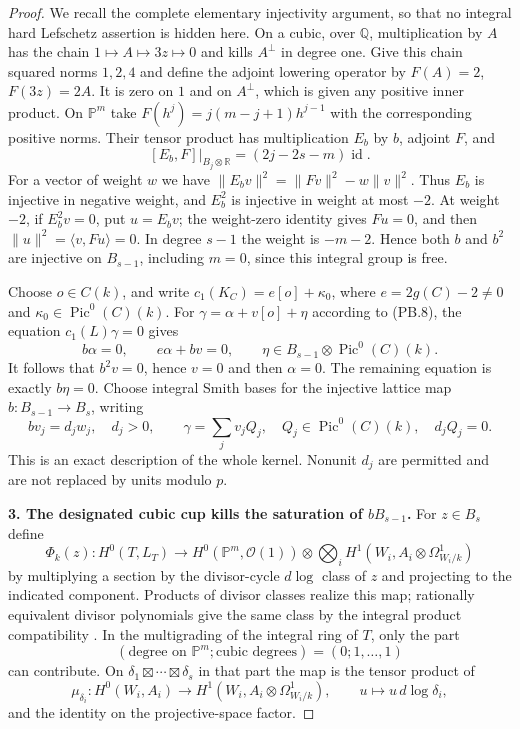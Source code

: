 \begin{proof}
We recall the complete elementary injectivity argument, so that no
integral hard Lefschetz assertion is hidden here. On a cubic, over
$\mathbb Q$, multiplication by $A$ has the chain
$1\mapsto A\mapsto3z\mapsto0$ and kills $A^\perp$ in degree one.
Give this chain squared norms $1,2,4$ and define the adjoint lowering
operator by $F(A)=2$, $F(3z)=2A$. It is zero on $1$ and on $A^\perp$,
which is given any positive inner product. On $\mathbb P^m$ take
$F(h^j)=j(m-j+1)h^{j-1}$ with the corresponding positive norms.
Their tensor product has multiplication $E_b$ by $b$, adjoint $F$,
and
\[
 [E_b,F]|_{B_j\otimes\mathbb R}
       =(2j-2s-m)\operatorname{id}.
\]
For a vector of weight $w$ we have
$\|E_bv\|^2=\|Fv\|^2-w\|v\|^2$.
Thus $E_b$ is injective in negative weight, and $E_b^2$ is injective
in weight at most $-2$. At weight $-2$, if $E_b^2v=0$, put
$u=E_bv$; the weight-zero identity gives $Fu=0$, and then
$\|u\|^2=\langle v,Fu\rangle=0$. In degree $s-1$ the weight is
$-m-2$. Hence both $b$ and $b^2$ are injective on $B_{s-1}$,
including $m=0$, since this integral group is free.

Choose $o\in C(k)$, and write $c_1(K_C)=e[o]+\kappa_0$, where
$e=2g(C)-2\ne0$ and $\kappa_0\in\operatorname{Pic}^0(C)(k)$.
For $\gamma=\alpha+v[o]+\eta$ according to (PB.8), the equation
$c_1(L)\gamma=0$ gives
\[
 b\alpha=0,\qquad e\alpha+bv=0,
 \qquad
 \eta\in B_{s-1}\otimes\operatorname{Pic}^0(C)(k).
\]
It follows that $b^2v=0$, hence $v=0$ and then $\alpha=0$.
The remaining equation is exactly $b\eta=0$.
Choose integral Smith bases for the injective lattice map
$b:B_{s-1}\to B_s$, writing
\[
 bv_j=d_jw_j,\quad d_j>0,
 \qquad
 \gamma=\sum_jv_jQ_j,\quad
 Q_j\in\operatorname{Pic}^0(C)(k),\quad d_jQ_j=0.
 \tag{PB.9}
\]
This is an exact description of the whole kernel. Nonunit $d_j$
are permitted and are not replaced by units modulo $p$.

\textbf{3. The designated cubic cup kills the saturation of $bB_{s-1}$.}
For $z\in B_s$ define
\[
 \Phi_k(z):H^0(T,L_T)\longrightarrow
 H^0(\mathbb P^m,\mathcal O(1))\otimes
            \bigotimes_i H^1(W_i,A_i\otimes\Omega^1_{W_i/k})
 \tag{PB.10}
\]
by multiplying a section by the divisor-cycle $d\log$ class of $z$
and projecting to the indicated component. Products of divisor
classes realize this map; rationally equivalent divisor polynomials
give the same class by the integral product compatibility
\citep[Section 3, diagram (22), pp.~557--558]{cyBraunling2013}.
In the multigrading of the integral ring of $T$, only the part
\[
       (\text{degree on }\mathbb P^m;\text{cubic degrees})
                         =(0;1,\ldots,1)
 \tag{PB.11}
\]
can contribute. On $\delta_1\boxtimes\cdots\boxtimes\delta_s$
in that part the map is the tensor product of
\[
 \mu_{\delta_i}:H^0(W_i,A_i)\longrightarrow
           H^1(W_i,A_i\otimes\Omega^1_{W_i/k}),
 \qquad u\longmapsto u\,d\log\delta_i,
\]
and the identity on the projective-space factor.


\end{proof}
